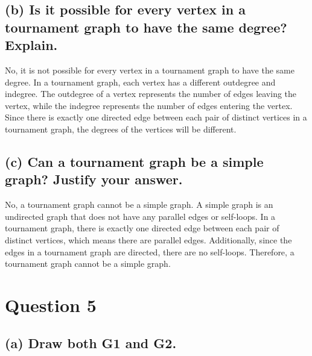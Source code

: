 \documentclass{article}
\begin{document}
\subsection*{(b) Is it possible for every vertex in a tournament graph to have the same degree? Explain.}
No, it is not possible for every vertex in a tournament graph to have the same degree. In a tournament graph, each vertex has a different outdegree and indegree. The outdegree of a vertex represents the number of edges leaving the vertex, while the indegree represents the number of edges entering the vertex. Since there is exactly one directed edge between each pair of distinct vertices in a tournament graph, the degrees of the vertices will be different.

\subsection*{(c) Can a tournament graph be a simple graph? Justify your answer.}
No, a tournament graph cannot be a simple graph. A simple graph is an undirected graph that does not have any parallel edges or self-loops. In a tournament graph, there is exactly one directed edge between each pair of distinct vertices, which means there are parallel edges. Additionally, since the edges in a tournament graph are directed, there are no self-loops. Therefore, a tournament graph cannot be a simple graph.

\section*{Question 5}
\subsection*{(a) Draw both G1 and G2.}
\begin{center}
\end{center}

\begin{center}
\end{center}
\end{document}
